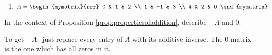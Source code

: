 \begin{enumialphparenastyle}
\begin{ex}
\begin{enumerate}
\item
$A = \begin{mymatrix}{rrr}
0 & 1 & 2 \\
1 & -1 & 3 \\
4 & 2 & 0 
\end{mymatrix}$
\end{enumerate}
\end{ex}

\begin{ex} In the context of Proposition \ref{prop:propertiesofaddition}, describe $-A$ and $0.$
\begin{sol}
To get $-A,$ just
replace every entry of $A$ with its additive inverse. The 0 matrix is the
one which has all zeros in it.
\end{sol}
\end{ex}

\end{enumialphparenastyle}